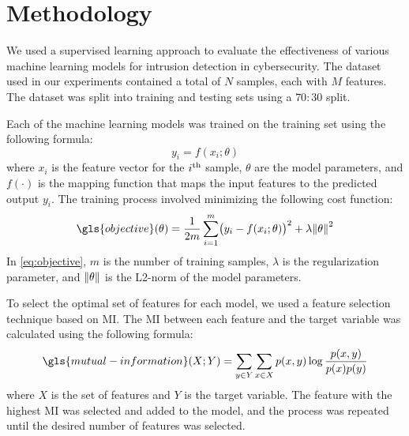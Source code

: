 \chapter{Methodology}  

We used a supervised learning approach to evaluate the effectiveness of various machine learning models for intrusion detection in cybersecurity. The dataset used in our experiments contained a total of \(N\) samples, each with \(M\) features. The dataset was split into training and testing sets using a \(70:30\) split.

Each of the machine learning models was trained on the training set using the following formula:
\begin{equation}
	y_i = f(x_i; \theta)
\end{equation}
where \(x_i\) is the feature vector for the \(i\textsuperscript{th}\) sample, \(\theta\) are the model parameters, and \(f(\cdot)\) is the mapping function that maps the input features to the predicted output \(y_i\). The training process involved minimizing the following cost function:
\begin{equation}
	\gls{objective}(\theta) = \frac{1}{2 m} \sum_{i = 1}^{m} \bigl( y_i - f(x_i; \theta) \bigr)^2 + \lambda \norm{\theta}^2
	\label{eq:objective}
\end{equation}
In \cref{eq:objective}, \(m\) is the number of training samples, \(\lambda\) is the regularization parameter, and \(\norm{\theta}\) is the L2-norm of the model parameters.

To select the optimal set of features for each model, we used a feature selection technique based on \ac{MI}. The \ac{MI} between each feature and the target variable was calculated using the following formula:
\begin{equation}
	\gls{mutual-information}(X; Y) = \sum_{y \in Y} \sum_{x \in X} p(x, y) \log \frac{p(x, y)}{p(x) p(y)}
\end{equation}
where \(X\) is the set of features and \(Y\) is the target variable. The feature with the highest \ac{MI} was selected and added to the model, and the process was repeated until the desired number of features was selected.

